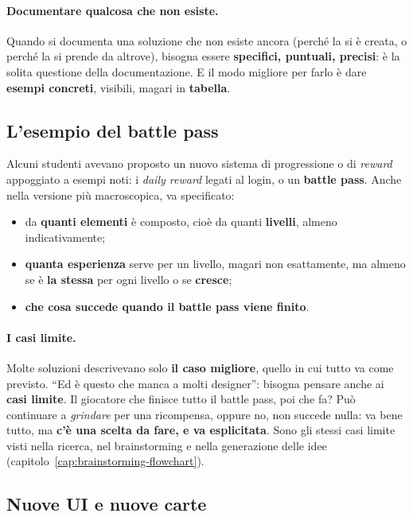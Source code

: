 \paragraph{Documentare qualcosa che non esiste.} Quando si documenta una
soluzione che non esiste ancora (perché la si è creata, o perché la si
prende da altrove), bisogna essere \textbf{specifici, puntuali, precisi}: è
la solita questione della documentazione. E il modo migliore per farlo è
dare \textbf{esempi concreti}, visibili, magari in \textbf{tabella}.

\subsection{L'esempio del battle pass}

Alcuni studenti avevano proposto un nuovo sistema di progressione o di
\emph{reward} appoggiato a esempi noti: i \emph{daily reward} legati al
login, o un \textbf{battle pass}. Anche nella versione più macroscopica, va
specificato:
\begin{itemize}
  \item da \textbf{quanti elementi} è composto, cioè da quanti
        \textbf{livelli}, almeno indicativamente;
  \item \textbf{quanta esperienza} serve per un livello, magari non
        esattamente, ma almeno se è \textbf{la stessa} per ogni livello o se
        \textbf{cresce};
  \item \textbf{che cosa succede quando il battle pass viene finito}.
\end{itemize}

\paragraph{I casi limite.} Molte soluzioni descrivevano solo \textbf{il caso
migliore}, quello in cui tutto va come previsto. ``Ed è questo che manca a
molti designer'': bisogna pensare anche ai \textbf{casi limite}. Il giocatore
che finisce tutto il battle pass, poi che fa? Può continuare a
\emph{grindare} per una ricompensa, oppure no, non succede nulla: va bene
tutto, ma \textbf{c'è una scelta da fare, e va esplicitata}. Sono gli stessi
casi limite visti nella ricerca, nel brainstorming e nella generazione delle
idee (capitolo~\ref{cap:brainstorming-flowchart}).

\subsection{Nuove UI e nuove carte}

